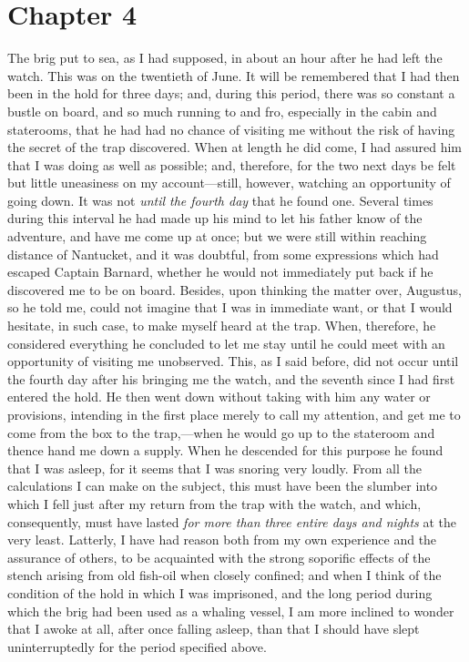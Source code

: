 \section{Chapter 4}
The brig put to sea, as I had supposed, in about an hour after he had left
the watch. This was on the twentieth of June. It will be remembered that I had
then been in the hold for three days; and, during this period, there was so
constant a bustle on board, and so much running to and fro, especially in the
cabin and staterooms, that he had had no chance of visiting me without the risk
of having the secret of the trap discovered. When at length he did come, I had
assured him that I was doing as well as possible; and, therefore, for the two
next days be felt but little uneasiness on my account---still, however, watching
an opportunity of going down. It was not \emph{until the fourth day} that he
found one. Several times during this interval he had made up his mind to let his
father know of the adventure, and have me come up at once; but we were still
within reaching distance of Nantucket, and it was doubtful, from some
expressions which had escaped Captain Barnard, whether he would not immediately
put back if he discovered me to be on board. Besides, upon thinking the matter
over, Augustus, so he told me, could not imagine that I was in immediate want,
or that I would hesitate, in such case, to make myself heard at the trap. When,
therefore, he considered everything he concluded to let me stay until he could
meet with an opportunity of visiting me unobserved. This, as I said before, did
not occur until the fourth day after his bringing me the watch, and the seventh
since I had first entered the hold. He then went down without taking with him
any water or provisions, intending in the first place merely to call my
attention, and get me to come from the box to the trap,---when he would go up to
the stateroom and thence hand me down a supply. When he descended for this
purpose he found that I was asleep, for it seems that I was snoring very loudly.
From all the calculations I can make on the subject, this must have been the
slumber into which I fell just after my return from the trap with the watch, and
which, consequently, must have lasted \emph{for more than three entire days and
nights} at the very least. Latterly, I have had reason both from my own
experience and the assurance of others, to be acquainted with the strong
soporific effects of the stench arising from old fish-oil when closely confined;
and when I think of the condition of the hold in which I was imprisoned, and the
long period during which the brig had been used as a whaling vessel, I am more
inclined to wonder that I awoke at all, after once falling asleep, than that I
should have slept uninterruptedly for the period specified above. 

